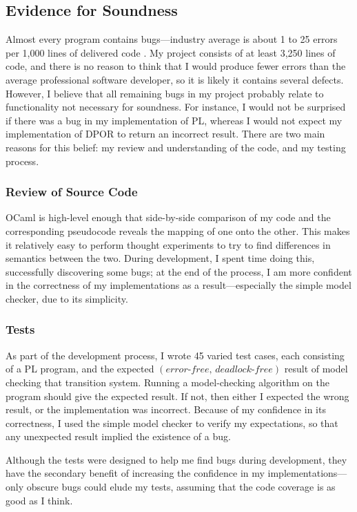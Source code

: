 \documentclass[12pt,a4paper,twoside,openright]{report}
\begin{document}
\subsection{Evidence for Soundness}
Almost every program contains bugs---industry average
is about 1 to 25 errors per 1,000 lines
of delivered code \cite{mccon04}.
My project consists of
at least 3,250 lines of code,
and there is no reason to think that I would
produce fewer errors than the average
professional software developer, so
it is likely it contains several defects.
However, I believe that
all remaining bugs in my project
probably relate
to functionality not necessary for
soundness. For instance, I would
not be surprised if there was a bug
in my implementation of PL,
whereas I would not expect
my implementation of DPOR to
return an incorrect result.
There are two main reasons
for this belief: my review and understanding
of the code, and my testing process.

\subsubsection{Review of Source Code}
OCaml is high-level enough that 
side-by-side comparison of my code
and the corresponding pseudocode reveals
the mapping of one onto the other. This
makes it relatively easy to perform
thought experiments to try to find
differences in semantics between the two.
During development, I spent time doing this,
successfully discovering some bugs; at
the end of the process, I am more
confident in the correctness of my implementations
as a result---especially
the simple model checker,
due to its simplicity.

\subsubsection{Tests}
\label{sec:pl-checker-tests}
As part of the development process,
I wrote 45 varied test cases, each
consisting of a PL program, and
the expected
$(\textit{error-free},\, \textit{deadlock-free})$
result of model checking that transition
system.
Running a
model-checking algorithm on the
program should give the expected
result. If not, then either
I expected the wrong result,
or the implementation was incorrect.
Because of my confidence in its
correctness, I used the simple
model checker to verify
my expectations, so that any
unexpected result implied the
existence of a bug.

Although the tests were designed
to help me find bugs during
development, they have the
secondary benefit of increasing the
confidence in my implementations---only
obscure bugs could
elude my tests, assuming that the
code coverage is as good as I think.
\end{document}
